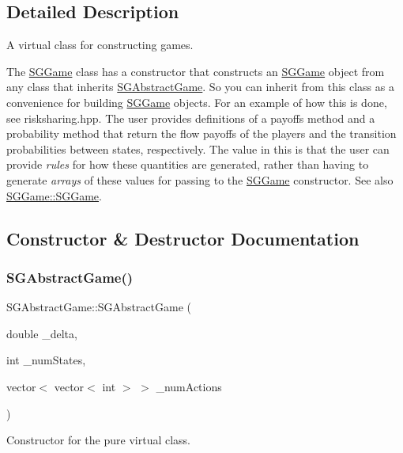 \subsection{Detailed Description}
A virtual class for constructing games. 

The \hyperlink{classSGGame}{S\+G\+Game} class has a constructor that constructs an \hyperlink{classSGGame}{S\+G\+Game} object from any class that inherits \hyperlink{classSGAbstractGame}{S\+G\+Abstract\+Game}. So you can inherit from this class as a convenience for building \hyperlink{classSGGame}{S\+G\+Game} objects. For an example of how this is done, see risksharing.\+hpp. The user provides definitions of a payoffs method and a probability method that return the flow payoffs of the players and the transition probabilities between states, respectively. The value in this is that the user can provide {\itshape rules} for how these quantities are generated, rather than having to generate {\itshape arrays} of these values for passing to the \hyperlink{classSGGame}{S\+G\+Game} constructor. See also \hyperlink{classSGGame_a935fc76700c675f842dc1666ffe2e8f7}{S\+G\+Game\+::\+S\+G\+Game}. 

\subsection{Constructor \& Destructor Documentation}
\mbox{\label{classSGAbstractGame_aa4d3130442e99f23f0ec78526629f0b4}} 
\subsubsection{\texorpdfstring{S\+G\+Abstract\+Game()}{SGAbstractGame()}}
{\footnotesize\ttfamily S\+G\+Abstract\+Game\+::\+S\+G\+Abstract\+Game (\begin{DoxyParamCaption}\item[{double}]{\+\_\+delta,  }\item[{int}]{\+\_\+num\+States,  }\item[{vector$<$ vector$<$ int $>$ $>$}]{\+\_\+num\+Actions }\end{DoxyParamCaption})\hspace{0.3cm}{\ttfamily [inline]}}



Constructor for the pure virtual class. 

